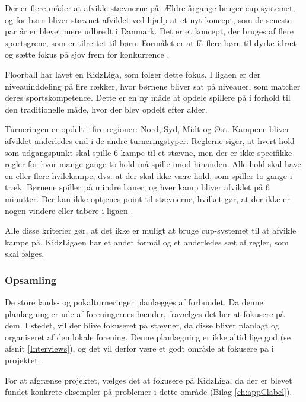 Der er flere måder at afvikle stævnerne på. Ældre årgange bruger cup-systemet, og for børn bliver stævnet afviklet ved hjælp at et nyt koncept, som de seneste par år er blevet mere udbredt i Danmark. Det er et koncept, der bruges af flere sportsgrene, som er tilrettet til børn. Formålet er at få flere børn til dyrke idræt og sætte fokus på sjov frem for konkurrence \citep{kidzRegler}.
\par
Floorball har lavet en KidzLiga, som følger dette fokus. I ligaen er der niveauinddeling på fire rækker, hvor børnene bliver sat på niveauer, som matcher deres sportskompetence. Dette er en ny måde at opdele spillere på i forhold til den traditionelle måde, hvor der blev opdelt efter alder.
\par
Turneringen er opdelt i fire regioner: Nord, Syd, Midt og Øst. Kampene bliver afviklet anderledes end i de andre turneringstyper. Reglerne siger, at hvert hold som udgangspunkt skal spille 6 kampe til et stævne, men der er ikke specifikke regler for hvor mange gange to hold må spille imod hinanden. Alle hold skal have en eller flere hvilekampe, dvs. at der skal ikke være hold, som spiller to gange i træk. Børnene spiller på mindre baner, og hver kamp bliver afviklet på 6 minutter. Der kan ikke optjenes point til stævnerne, hvilket gør, at der ikke er nogen vindere eller tabere i ligaen \citep{kidzRegler}.
\par
Alle disse kriterier gør, at det ikke er muligt at bruge cup-systemet til at afvikle kampe på. KidzLigaen har et andet formål og et anderledes sæt af regler, som skal følges.

\subsubsection*{Opsamling}
De store lands- og pokalturneringer planlægges af forbundet. Da denne planlægning er ude af foreningernes hænder, fravælges det her at fokusere på dem. I stedet, vil der blive fokuseret på stævner, da disse bliver planlagt og organiseret af den lokale forening. Denne planlægning er ikke altid lige god (se afsnit \ref{Interviews}), og det vil derfor være et godt område at fokusere på i projektet.
\par
For at afgrænse projektet, vælges det at fokusere på KidzLiga, da der er blevet fundet konkrete eksempler på problemer i dette område (Bilag \ref{ch:appClabel}). 

